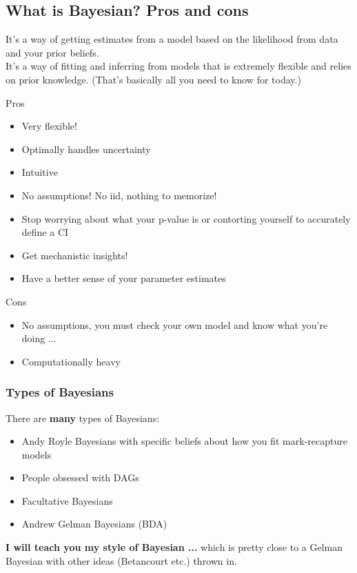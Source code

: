 \documentclass[11pt]{article}
\begin{document}
\subsection{What is Bayesian? Pros and cons}
It's a way of getting estimates from a model based on the likelihood from data and your prior beliefs.\\
It's a way of fitting and inferring from models that is extremely flexible and relies on prior knowledge. (That's basically all you need to know for today.)\\


Pros
\begin{itemize}
\item Very flexible!
\item Optimally handles uncertainty
\item Intuitive
\item No assumptions! No iid, nothing to memorize!
\item Stop worrying about what your p-value is or contorting yourself to accurately define a CI
\item Get mechanistic insights!
\item Have a better sense of your parameter estimates
\end{itemize}

Cons
\begin{itemize}
\item No assumptions, you must check your own model and know what you're doing ... 
\item Computationally heavy
\end{itemize}

\subsubsection{Types of Bayesians}
There are {\bf many} types of Bayesians:
\begin{itemize}
\item Andy Royle Bayesians with specific beliefs about how you fit mark-recapture models
\item People obsessed with DAGs
\item Facultative Bayesians
\item Andrew Gelman Bayesians (BDA)
\end{itemize}

{\bf I will teach you my style of Bayesian ...} which is pretty close to a Gelman Bayesian with other ideas (Betancourt etc.) thrown in. 
\end{document}
